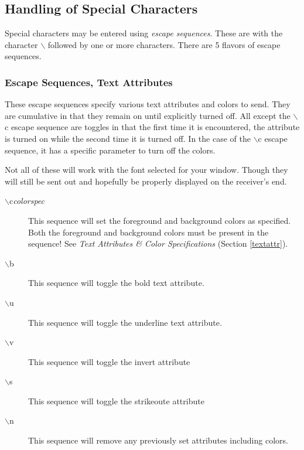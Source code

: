 \documentclass[titlepage]{article}
\begin{document}
\subsection{Handling of Special Characters}
Special characters may be entered using \textit{escape sequences}.
These are with the character $\backslash$ followed by one or more
characters. There are 5 flavors of escape sequences.

\subsubsection{Escape Sequences, Text Attributes}
These escape sequences specify various text attributes and colors to send. They
are cumulative in that they remain on until explicitly turned off. All except the
$\backslash$c escape sequence are toggles in that the first time it is encountered, the
attribute is turned on while the second time it is turned off. In the case of the $\backslash$c
escape sequence, it has a specific parameter to turn off the colors.

Not all of these will work with the font selected for your window. Though they will still
be sent out and hopefully be properly displayed on the receiver's end.

\begin{description}
\item[$\backslash$c\textit{colorspec}] This sequence will set the foreground 
and background colors as specified. Both the foreground and background colors
must be present in the sequence! See \textit{Text Attributes \& Color Specifications} 
(Section \ref{textattr}).

\item[$\backslash$b] This sequence will toggle the bold text attribute.
\item[$\backslash$u] This sequence will toggle the underline text attribute. 
\item[$\backslash$v] This sequence will toggle the invert attribute
\item[$\backslash$s] This sequence will toggle the strikeoute attribute
\item[$\backslash$n] This sequence will remove any previously set attributes
including colors.
\end{description}
\end{document}
